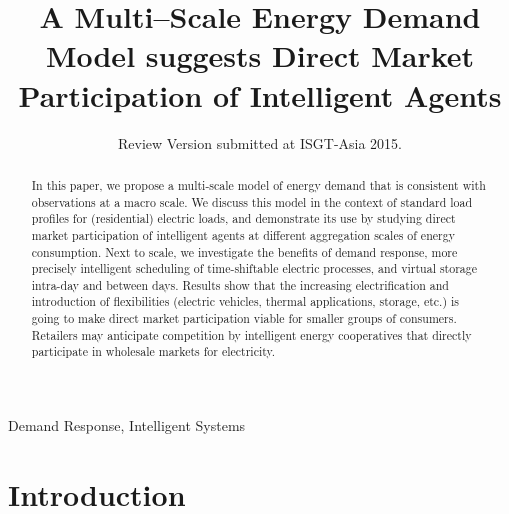 \documentclass[conference]{IEEEtran}
\begin{document}
\title{A Multi--Scale Energy Demand Model suggests Direct Market Participation of Intelligent Agents}
\author{Review Version submitted at ISGT-Asia 2015.%
}

\maketitle

\begin{abstract} In this paper, we propose a multi-scale model of energy demand that is consistent with observations at a macro scale. We discuss this model in the context of standard load profiles for (residential) electric loads, and demonstrate its use by studying direct market participation of intelligent agents at different aggregation scales of energy consumption. Next to scale, we investigate the benefits of demand response, more precisely intelligent scheduling of time-shiftable electric processes, and virtual storage intra-day and between days. Results show that the increasing electrification and introduction of flexibilities (electric vehicles, thermal applications, storage, etc.) is going to make direct market participation viable for smaller groups of consumers. Retailers may anticipate competition by intelligent energy cooperatives that directly participate in wholesale markets for electricity.
\end{abstract}

\begin{keywords}
Demand Response, Intelligent Systems
\end{keywords}

\IEEEpeerreviewmaketitle

\section{Introduction}
\label{sec:Introduction}
\end{document}
